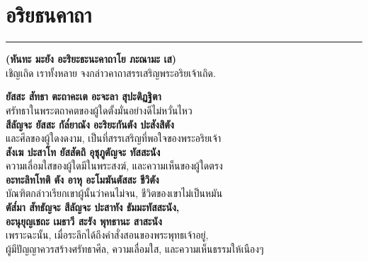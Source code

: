 \documentclass[12pt]{article}
\begin{document}
\section{อริยธนคาถา}
\hrule
\begin{center}
\textbf{(หันทะ มะยัง อะริยะธะนะคาถาโย ภะณามะ เส)}\\
\indent เชิญเถิด เราทั้งหลาย จงกล่าวคาถาสรรเสริญพระอริยเจ้าเถิด.
\end{center}
\textbf{ยัสสะ สัทธา ตะถาคะเต อะจะลา สุปะติฏฐิตา}\\
\indent ศรัทธาในพระตถาคตของผู้ใดตั้งมั่นอย่างดีไม่หวั่นไหว\\
\textbf{สีลัญจะ ยัสสะ กัล๎ยาณัง อะริยะกันตัง ปะสังสิตัง}\\
\indent และศีลของผู้ใดงดงาม, เป็นที่สรรเสริญที่พอใจของพระอริยเจ้า\\
\textbf{สังเฆ ปะสาโท ยัสสัตถิ อุชุภูตัญจะ ทัสสะนัง}\\
\indent ความเลื่อมใสของผู้ใดมีในพระสงฆ์, และความเห็นของผู้ใดตรง\\
\textbf{อะทะลิทโทติ ตัง อาหุ อะโมฆันตัสสะ ชีวิตัง}\\
\indent บัณฑิตกล่าวเรียกเขาผู้นั้นว่าคนไม่จน, ชีวิตของเขาไม่เป็นหมัน\\
\textbf{ตัส๎มา สัทธัญจะ สีลัญจะ ปะสาทัง ธัมมะทัสสะนัง,\\
อะนุยุญเชถะ เมธาวี สะรัง พุทธานะ สาสะนัง}\\
\indent เพราะฉะนั้น, เมื่อระลึกได้ถึงคำสั่งสอนของพระพุทธเจ้าอยู่,\\
\indent ผู้มีปัญญาควรสร้างศรัทธาศีล, ความเลื่อมใส, และความเห็นธรรมให้เนืองๆ\\

\pagebreak
\end{document}
